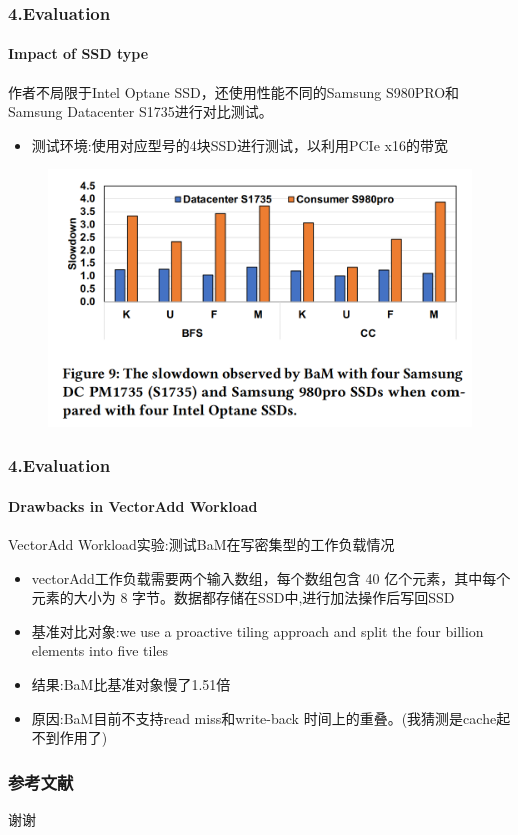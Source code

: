 \documentclass[10pt]{ctexbeamer}
\begin{document}
\begin{frame}
  \frametitle{4.Evaluation}
  \framesubtitle{Impact of SSD type}
  作者不局限于Intel Optane SSD，还使用性能不同的Samsung S980PRO和Samsung Datacenter S1735进行对比测试。
  \begin{itemize}
    \item 测试环境:使用对应型号的4块SSD进行测试，以利用PCIe x16的带宽
  \end{itemize}
  \begin{figure}
    \includegraphics[width=.5\textwidth,height=.5\textheight]{images/ssd-type.png}
  \end{figure}

\end{frame}
\begin{frame}
  \frametitle{4.Evaluation}
  \framesubtitle{Drawbacks in VectorAdd Workload}
  VectorAdd Workload实验:测试BaM在写密集型的工作负载情况\
  \begin{itemize}
    \item vectorAdd工作负载需要两个输入数组，每个数组包含 40 亿个元素，其中每个元素的大小为 8 字节。数据都存储在SSD中,进行加法操作后写回SSD
    \item 基准对比对象:we use a proactive tiling approach and split the four billion elements into five tiles
  \end{itemize}
  \begin{itemize}
    \item 结果:BaM比基准对象慢了1.51倍
    \item 原因:BaM目前不支持read miss和write-back 时间上的重叠。(我猜测是cache起不到作用了)
  \end{itemize}
\end{frame}
\begin{frame}
  \frametitle{参考文献}
  \nocite{*}%
  \printbibliography%
\end{frame}

\begin{frame}[plain]
  \vfill
  \centerline{\Huge 谢谢}
  \vfill
\end{frame}
\end{document}
